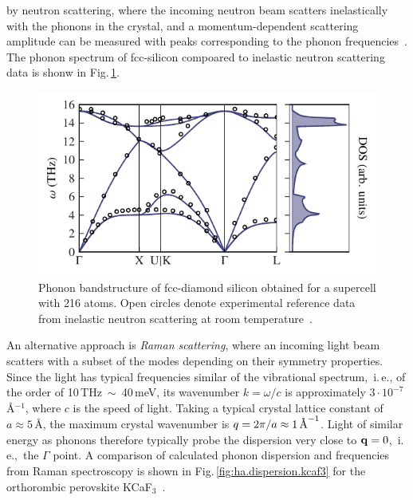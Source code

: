  by neutron scattering, where the incoming neutron beam scatters inelastically with the phonons in the crystal, and a momentum-dependent scattering amplitude can be measured with peaks corresponding to the phonon frequencies~\cite{Squires}. The phonon spectrum of fcc-silicon compoared to inelastic neutron scattering data is shonw in Fig.\,\ref{fig:ha.dispersion.si}. \begin{figure}
	\includegraphics[width=\textwidth]{./data/plots/anharmonicity/3_bandstructures/Si/bands_dos_emb.pdf}
	\caption{
		Phonon bandstructure of fcc-diamond silicon obtained for a supercell with 216 atoms. Open circles denote experimental reference data from inelastic neutron scattering at room temperature~\cite{Nilsson1972}.
	}
	\label{fig:ha.dispersion.si}
\end{figure}
An alternative approach is \emph{Raman scattering}, where an incoming light beam scatters with a subset of the modes depending on their symmetry properties. Since the light has typical frequencies similar of the vibrational spectrum,~i.\,e., of the order of 10\,THz~$\sim$~40\,meV, its wavenumber $k=\omega/c$ is approximately $3 \cdot 10 ^{-7}$\,\AA$^{-1}$, where $c$ is the speed of light. Taking a typical crystal lattice constant of $a \approx 5\,$\AA, the maximum crystal wavenumber is $q=2 \pi / a \approx 1\,{\text \AA}^{-1}$. Light of similar energy as phonons therefore typically probe the dispersion very close to ${\bf q} = 0$,~i.\,e.,~the $\Gamma$ point. A comparison of calculated phonon dispersion and frequencies from Raman spectroscopy is shown in Fig.\,\ref{fig:ha.dispersion.kcaf3} for the orthorombic perovskite KCaF$_3$~\cite{Bulou1980, Demetriou2005, Knight2005}.

